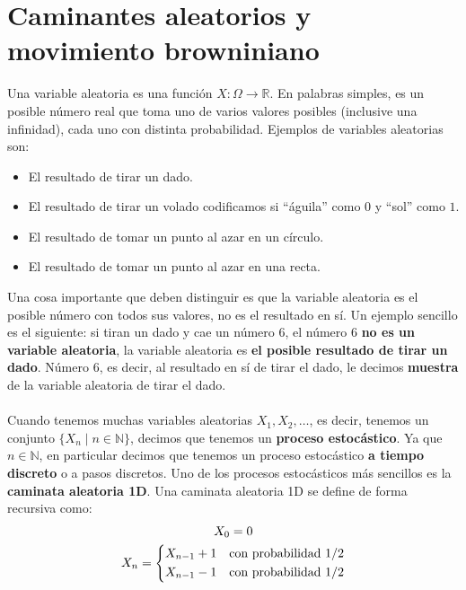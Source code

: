 \documentclass[11pt]{article}
\begin{document}
\section{Caminantes aleatorios y movimiento browniniano}
Una variable aleatoria es una función $X:\Omega \to \mathbb{R}$. En palabras simples, es un posible número real que toma uno de varios valores posibles (inclusive una infinidad), cada uno con distinta probabilidad. Ejemplos de variables aleatorias son:
\begin{itemize}
    \item El resultado de tirar un dado.
    \item El resultado de tirar un volado codificamos si ``águila'' como $0$ y ``sol'' como $1$.
    \item El resultado de tomar un punto al azar en un círculo.
    \item El resultado de tomar un punto al azar en una recta.
\end{itemize}
Una cosa importante que deben distinguir es que la variable aleatoria es el posible número con todos sus valores, no es el resultado en sí. Un ejemplo sencillo es el siguiente: si tiran un dado y cae un número 6, el número 6 \textbf{no es un variable aleatoria}, la variable aleatoria es \textbf{el posible resultado de tirar un dado}. Número 6, es decir, al resultado en sí de tirar el dado, le decimos \textbf{muestra} de la variable aleatoria de tirar el dado.
\\
\\Cuando tenemos muchas variables aleatorias $X_1,X_2,\ldots $, es decir, tenemos un conjunto $\{X_n \mid n \in \mathbb{N}\}$, decimos que tenemos un \textbf{proceso estocástico}. Ya que $n \in \mathbb{N}$, en particular decimos que tenemos un proceso estocástico \textbf{a tiempo discreto} o a pasos discretos. Uno de los procesos estocásticos más sencillos es la \textbf{caminata aleatoria 1D}. Una caminata aleatoria 1D se define de forma recursiva como:
\begin{equation}
    \begin{gathered}
        X_0 = 0 \\
        X_n = \begin{dcases}
            X_{n-1}+1 & \text{con probabilidad } 1/2 \\
            X_{n-1}-1 & \text{con probabilidad } 1/2 \\
        \end{dcases}
    \end{gathered}
\end{equation}
\end{document}
